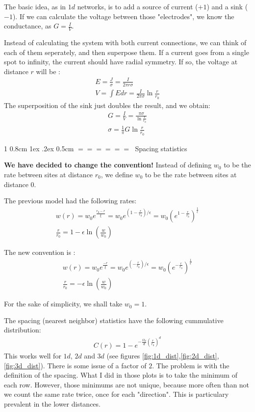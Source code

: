 \documentclass[onecolumn,fleqn,notitlepage,secnumarabic]{revtex4}
\makeatletter
\def\section{%
  \@startsection
    {section}%
    {1}%
    {\z@}%
    {0.8cm \@plus1ex \@minus .2ex}%
    {0.5cm}%
    {\Large\bf $=\!=\!=\!=\!=\!=\;$}%
}%
\makeatother
\begin{document}
The basic idea, as in $1d$ networks, is to add a source of current ($+1$) and a sink ($-1$). If we can calculate the voltage between those "electrodes", we know the conductance, as $G = \frac{I}{V}$. 

Instead of calculating the system with both current connections, we can think of each of them seperately, and then superpose them. If a current goes from a single spot to infinity, the current should have radial symmetry. If so, the voltage at distance $r$ will be :
\begin{align}
  E = \frac{J}{\sigma} = \frac{I}{2\pi r\sigma} \\
  V = \int E dr = \frac{I}{2\pi\sigma}\ln\frac{r}{r_0}
\end{align}
The superposition of the sink just doubles the result, and we obtain:
\begin{align}
    G = \frac{I}{V} = \frac{\pi\sigma }{\ln\frac{r}{r_0}}  \\
    \sigma = \frac{1}{\pi}G\ln\frac{r}{r_0}
\end{align}


\section{Spacing statistics}

{\bf We have decided to change the convention!} Instead of defining $w_0$ to be the rate between sites at distance $r_0$, we define $w_0$ to be the rate between sites at distance $0$.

The previous model had the following rates:
\begin{align}
    w(r) = w_0 e^{\frac{r_0-r}{\xi}}=w_0e^{(1-\frac{r}{r_0})/\epsilon} = w_0 \left(e^{1-\frac{r}{r_0}}\right)^\frac{1}{\epsilon}\\
    \frac{r}{r_0} = 1 - \epsilon\ln \left(\frac{w}{w_0}\right)
\end{align}

The new convention is :
\begin{align}
    w(r) = w_0 e^{\frac{-r}{\xi}}=w_0e^{(-\frac{r}{r_0})/\epsilon} = w_0 \left(e^{-\frac{r}{r_0}}\right)^\frac{1}{\epsilon}\\
    \frac{r}{r_0} = - \epsilon\ln \left(\frac{w}{w_0}\right)
\end{align}


For the sake of simplicity, we shall take $w_0=1$.

The spacing (nearest neighbor) statistics have the following cummulative distribution:
\begin{align}
    C(r) = 1-e^{-\frac{\Omega_d}{d}\left(\frac{r}{r_0}\right)^d}
\end{align}
This works well for $1d$, $2d$ and $3d$ (see figures \ref{fig:1d_dist},\ref{fig:2d_dist},\ref{fig:3d_dist}). There is some issue of a factor of $2$. The problem is with the definition of the spacing. What I did in those plots is to take the minimum of each row. However, those minimums are not unique, because more often than not we count the same rate twice, once for each "direction". This is particulary prevalent in the lower distances.
\end{document}

